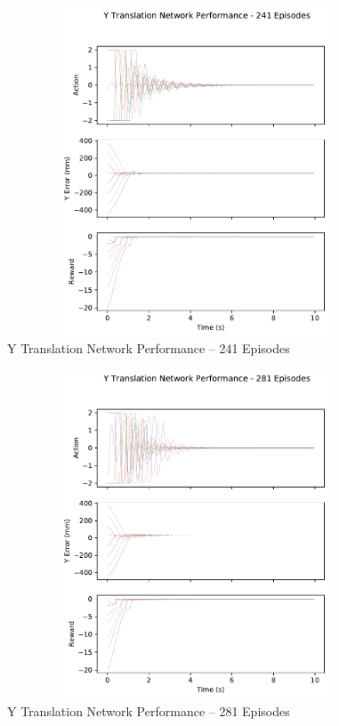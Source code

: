 \begin{figure}[H]
	\centering
	\includegraphics[width=6in, height=3.85in, keepaspectratio]{figures/train_figs/transy_transitions/2_241.pdf}
	\caption{Y Translation Network Performance -- 241 Episodes}
\end{figure}
\begin{figure}[H]
	\centering
	\includegraphics[width=6in, height=3.85in, keepaspectratio]{figures/train_figs/transy_transitions/2_281.pdf}
	\caption{Y Translation Network Performance -- 281 Episodes}
\end{figure}
